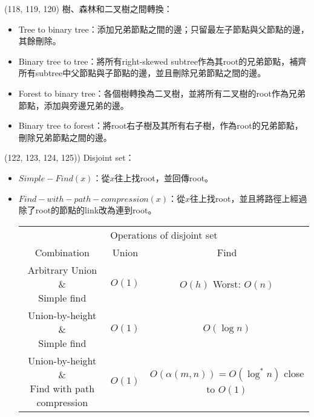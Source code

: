 \item \begin{theorem}{(118, 119, 120)} 樹、森林和二叉樹之間轉換：\begin{itemize}
        \item Tree to binary tree：添加兄弟節點之間的邊；只留最左子節點與父節點的邊，其餘刪除。
        \item Binary tree to tree：將所有right-skewed subtree作為其root的兄弟節點，補齊所有subtree中父節點與子節點的邊，並且刪除兄弟節點之間的邊。
        \item Forest to binary tree：各個樹轉換為二叉樹，並將所有二叉樹的root作為兄弟節點，添加與旁邊兄弟的邊。
        \item Binary tree to forest：將root右子樹及其所有右子樹，作為root的兄弟節點，刪除兄弟節點之間的邊。
    \end{itemize}
\end{theorem}

\item \begin{theorem}{(122, 123, 124, 125))} Disjoint set： \begin{itemize}
        \item $Simple-Find(x)$：從$x$往上找root，並回傳root。
        \item $Find-with-path-compression(x)$：從$x$往上找root，並且將路徑上經過除了root的節點的link改為連到root。
        \begin{table}[H]
            \centering
            \begin{tabular}{|c|c|c|}
                \hline
                \multicolumn{3}{|c|}{Operations of disjoint set} \\
                \Xhline{3\arrayrulewidth}
                Combination & Union & Find \\
                \Xhline{2\arrayrulewidth}
                \makecell{Arbitrary Union \&\\Simple find} & $O(1)$ & \makecell{$O(h)$\\Worst: $O(n)$} \\
                \hline
                \makecell{Union-by-height \&\\Simple find} & $O(1)$ & $O(\log n)$ \\
                \hline
                \makecell{Union-by-height \&\\Find with path compression} & $O(1)$ & \makecell{$O(\alpha(m, n)) = O(\log^* n)$\\close to $O(1)$} \\
                \hline
            \end{tabular}
        \end{table}
    \end{itemize}
\end{theorem}
